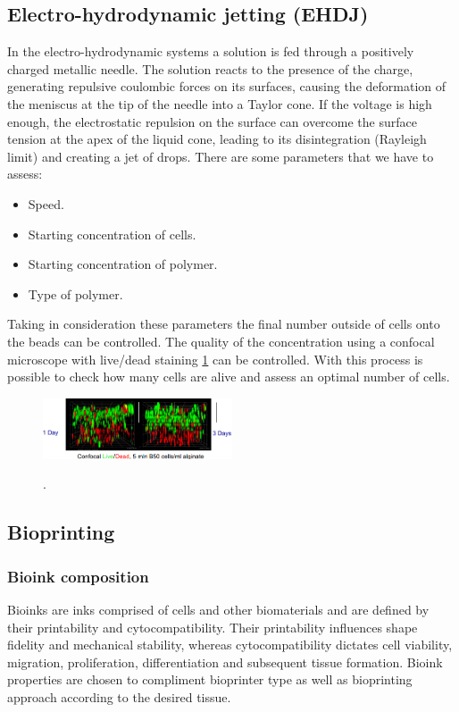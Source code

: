     \subsection{Electro-hydrodynamic jetting (EHDJ)}
    In the electro-hydrodynamic systems a solution is fed through a positively charged metallic needle.
    The solution reacts to the presence of the charge, generating repulsive coulombic forces on its surfaces, causing the deformation of the meniscus at the tip of the needle into a Taylor cone.
    If the voltage is high enough, the electrostatic repulsion on the surface can overcome the surface tension at the apex of the liquid cone, leading to its disintegration (Rayleigh limit) and creating a jet of drops.
    There are some parameters that we have to assess:

    \begin{multicols}{2}
        \begin{itemize}
            \item Speed.
            \item Starting concentration of cells.
            \item Starting concentration of polymer.
            \item Type of polymer.
        \end{itemize}
    \end{multicols}

    Taking in consideration these parameters the final number outside of cells onto the beads can be controlled.
    The quality of the concentration using a confocal microscope with live/dead staining \ref{fig:staining} can be controlled.
    With this process is possible to check how many cells are alive and assess an optimal number of cells.

    \begin{figure}[H]
        \centering
        \includegraphics[width=0.5\textwidth]{staining.png}
        \caption{\label{fig:staining}}.
    \end{figure}

	\subsection{Bioprinting}

		\subsubsection{Bioink composition}
		Bioinks are inks comprised of cells and other biomaterials and are defined by their printability and cytocompatibility. Their printability influences shape fidelity and mechanical stability, whereas cytocompatibility dictates cell viability, migration, proliferation, differentiation and subsequent tissue formation. Bioink properties are chosen to compliment bioprinter type as well as bioprinting approach according to the desired tissue.

